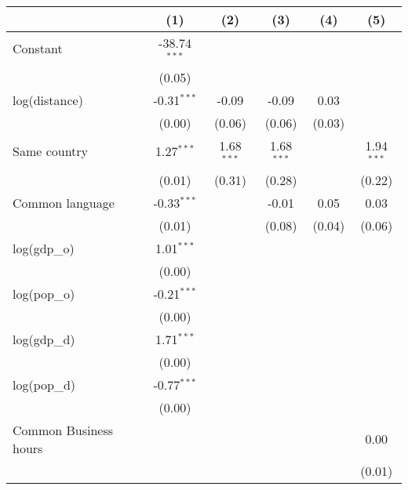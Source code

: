 
\begingroup
\centering
\small
\begin{tabular}{lccccc}
   \toprule
                            & (1)            & (2)          & (3)          & (4)     & (5)\\  
   \midrule 
   Constant                 & -38.74$^{***}$ &              &              &         &   \\   
                            & (0.05)         &              &              &         &   \\   
   log(distance)            & -0.31$^{***}$  & -0.09        & -0.09        & 0.03    &   \\   
                            & (0.00)         & (0.06)       & (0.06)       & (0.03)  &   \\   
   Same country             & 1.27$^{***}$   & 1.68$^{***}$ & 1.68$^{***}$ &         & 1.94$^{***}$\\   
                            & (0.01)         & (0.31)       & (0.28)       &         & (0.22)\\   
   Common language          & -0.33$^{***}$  &              & -0.01        & 0.05    & 0.03\\   
                            & (0.01)         &              & (0.08)       & (0.04)  & (0.06)\\   
   log(gdp\_o)              & 1.01$^{***}$   &              &              &         &   \\   
                            & (0.00)         &              &              &         &   \\   
   log(pop\_o)              & -0.21$^{***}$  &              &              &         &   \\   
                            & (0.00)         &              &              &         &   \\   
   log(gdp\_d)              & 1.71$^{***}$   &              &              &         &   \\   
                            & (0.00)         &              &              &         &   \\   
   log(pop\_d)              & -0.77$^{***}$  &              &              &         &   \\   
                            & (0.00)         &              &              &         &   \\   
   Common Business hours    &                &              &              &         & 0.00\\   
                            &                &              &              &         & (0.01)\\   

\end{tabular}
